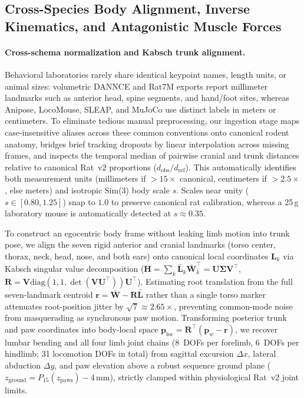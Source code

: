 \documentclass[10pt,twocolumn,letterpaper]{article}
\begin{document}
\subsection{Cross-Species Body Alignment, Inverse Kinematics, and Antagonistic Muscle Forces}

\paragraph{Cross-schema normalization and Kabsch trunk alignment.}
Behavioral laboratories rarely share identical keypoint names, length units, or animal sizes: volumetric DANNCE and Rat7M exports report millimeter landmarks such as anterior head, spine segments, and hand/foot sites, whereas Anipose, LocoMouse, SLEAP, and MuJoCo use distinct labels in meters or centimeters. To eliminate tedious manual preprocessing, our ingestion stage maps case-insensitive aliases across these common conventions onto canonical rodent anatomy, bridges brief tracking dropouts by linear interpolation across missing frames, and inspects the temporal median of pairwise cranial and trunk distances relative to canonical Rat~v2 proportions ($d_{\mathrm{obs}} / d_{\mathrm{ref}}$). This automatically identifies both measurement units (millimeters if $>15\times$ canonical, centimeters if $>2.5\times$, else meters) and isotropic Sim(3) body scale $s$. Scales near unity ($s \in [0.80, 1.25]$) snap to $1.0$ to preserve canonical rat calibration, whereas a 25\,g laboratory mouse is automatically detected at $s \approx 0.35$.

To construct an egocentric body frame without leaking limb motion into trunk pose, we align the seven rigid anterior and cranial landmarks (torso center, thorax, neck, head, nose, and both ears) onto canonical local coordinates $\mathbf{L}_k$ via Kabsch singular value decomposition ($\mathbf{H} = \sum_k \bar{\mathbf{L}}_k \bar{\mathbf{W}}_k^\top = \mathbf{U}\boldsymbol{\Sigma}\mathbf{V}^\top$, $\mathbf{R} = \mathbf{V}\mathrm{diag}(1,1,\det(\mathbf{V}\mathbf{U}^\top))\mathbf{U}^\top$). Estimating root translation from the full seven-landmark centroid $\mathbf{r} = \bar{\mathbf{W}} - \mathbf{R}\bar{\mathbf{L}}$ rather than a single torso marker attenuates root-position jitter by $\sqrt{7} \approx 2.65\times$, preventing common-mode noise from masquerading as synchronous paw motion. Transforming posterior trunk and paw coordinates into body-local space $\mathbf{p}_{\mathrm{loc}} = \mathbf{R}^\top(\mathbf{p}_w - \mathbf{r})$, we recover lumbar bending and all four limb joint chains (8~DOFs per forelimb, 6~DOFs per hindlimb; 31 locomotion DOFs in total) from sagittal excursion $\Delta x$, lateral abduction $\Delta y$, and paw elevation above a robust sequence ground plane ($z_{\mathrm{ground}} = P_{15}(z_{\mathrm{paws}}) - 4$\,mm), strictly clamped within physiological Rat~v2 joint limits.
\end{document}
